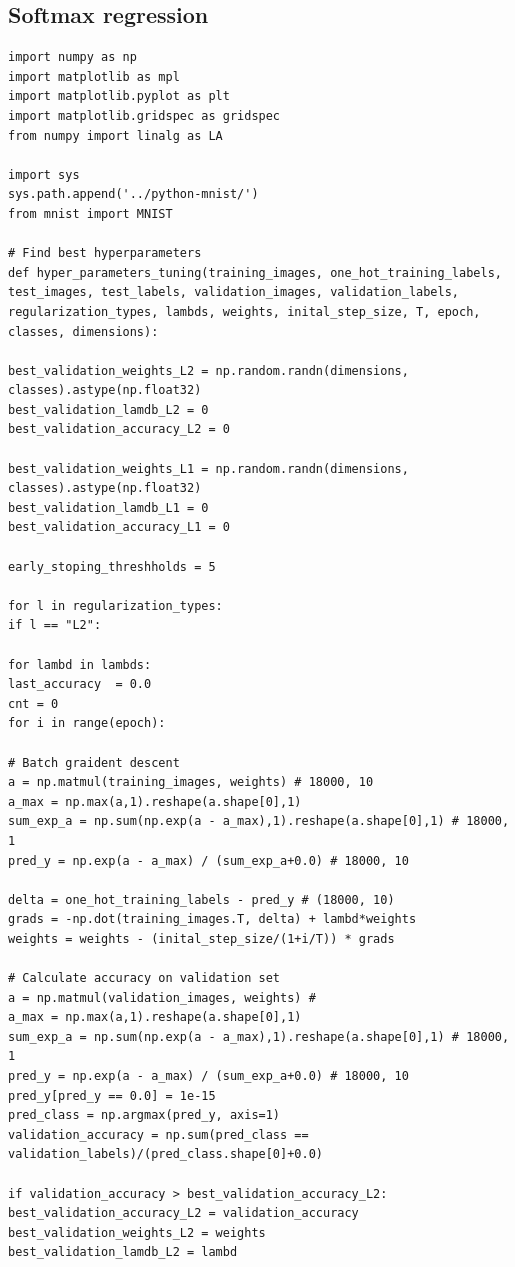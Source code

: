 \documentclass{article} %
\begin{document}
\subsection{Softmax regression}
\lstset{language=Python}
\begin{lstlisting}
import numpy as np
import matplotlib as mpl
import matplotlib.pyplot as plt
import matplotlib.gridspec as gridspec
from numpy import linalg as LA

import sys
sys.path.append('../python-mnist/')
from mnist import MNIST

# Find best hyperparameters 
def hyper_parameters_tuning(training_images, one_hot_training_labels, test_images, test_labels, validation_images, validation_labels, regularization_types, lambds, weights, inital_step_size, T, epoch, classes, dimensions):

best_validation_weights_L2 = np.random.randn(dimensions, classes).astype(np.float32) 
best_validation_lamdb_L2 = 0
best_validation_accuracy_L2 = 0

best_validation_weights_L1 = np.random.randn(dimensions, classes).astype(np.float32) 
best_validation_lamdb_L1 = 0
best_validation_accuracy_L1 = 0

early_stoping_threshholds = 5

for l in regularization_types:
if l == "L2":

for lambd in lambds:
last_accuracy  = 0.0
cnt = 0
for i in range(epoch):

# Batch graident descent
a = np.matmul(training_images, weights) # 18000, 10
a_max = np.max(a,1).reshape(a.shape[0],1)
sum_exp_a = np.sum(np.exp(a - a_max),1).reshape(a.shape[0],1) # 18000, 1
pred_y = np.exp(a - a_max) / (sum_exp_a+0.0) # 18000, 10

delta = one_hot_training_labels - pred_y # (18000, 10)
grads = -np.dot(training_images.T, delta) + lambd*weights
weights = weights - (inital_step_size/(1+i/T)) * grads

# Calculate accuracy on validation set
a = np.matmul(validation_images, weights) #
a_max = np.max(a,1).reshape(a.shape[0],1)
sum_exp_a = np.sum(np.exp(a - a_max),1).reshape(a.shape[0],1) # 18000, 1
pred_y = np.exp(a - a_max) / (sum_exp_a+0.0) # 18000, 10
pred_y[pred_y == 0.0] = 1e-15       
pred_class = np.argmax(pred_y, axis=1)
validation_accuracy = np.sum(pred_class == validation_labels)/(pred_class.shape[0]+0.0)

if validation_accuracy > best_validation_accuracy_L2:
best_validation_accuracy_L2 = validation_accuracy
best_validation_weights_L2 = weights
best_validation_lamdb_L2 = lambd


\end{lstlisting}
\end{document}

